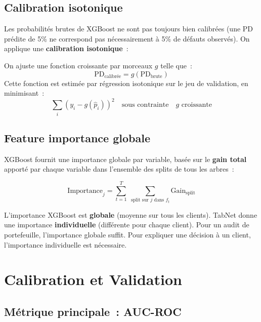 \documentclass[12pt,a4paper]{article}
\begin{document}
\subsection{Calibration isotonique}

Les probabilit\'es brutes de XGBoost ne sont pas toujours bien calibr\'ees (une PD pr\'edite de 5\% ne correspond pas n\'ecessairement \`a 5\% de d\'efauts observ\'es). On applique une \textbf{calibration isotonique}~:

\begin{definitionbox}
On ajuste une fonction croissante par morceaux $g$ telle que~:
$$\text{PD}_{\text{calibr\'ee}} = g(\text{PD}_{\text{brute}})$$
Cette fonction est estim\'ee par r\'egression isotonique sur le jeu de validation, en minimisant~:
$$\sum_i \left(y_i - g(\hat{p}_i)\right)^2 \quad \text{sous contrainte} \quad g \text{ croissante}$$
\end{definitionbox}

\subsection{Feature importance globale}

XGBoost fournit une importance globale par variable, bas\'ee sur le \textbf{gain total} apport\'e par chaque variable dans l'ensemble des splits de tous les arbres~:

$$\text{Importance}_j = \sum_{t=1}^{T}\;\sum_{\text{split sur } j \text{ dans } f_t} \text{Gain}_{\text{split}}$$

\begin{interpretbox}
L'importance XGBoost est \textbf{globale} (moyenne sur tous les clients). TabNet donne une importance \textbf{individuelle} (diff\'erente pour chaque client). Pour un audit de portefeuille, l'importance globale suffit. Pour expliquer une d\'ecision \`a un client, l'importance individuelle est n\'ecessaire.
\end{interpretbox}


\section{Calibration et Validation}

\subsection{M\'etrique principale~: AUC-ROC}
\end{document}
